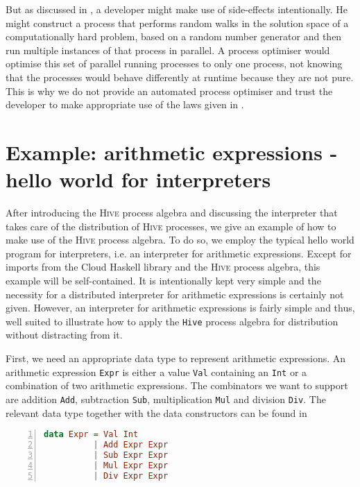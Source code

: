 But as discussed in , a developer might make use of side-effects intentionally. He might construct a process that performs random walks in the solution space of a computationally hard problem, based on a random number generator and then run multiple instances of that process in parallel. A process optimiser would optimise this set of parallel running processes to only one process, not knowing that the processes would behave differently at runtime because they are not pure. This is why we do not provide an automated process optimiser and trust the developer to make appropriate use of the laws given in .

\section{Example: arithmetic expressions - hello world for interpreters}
\label{chp:example}
After introducing the \textsc{Hive} process algebra and discussing the interpreter that takes care of the distribution of \textsc{Hive} processes, we give an example of how to make use of the \textsc{Hive} process algebra. To do so, we employ the typical hello world program for interpreters, i.e. an interpreter for arithmetic expressions. Except for imports from the \textsf{Cloud Haskell} library and the \textsc{Hive} process algebra, this example will be self-contained. It is intentionally kept very simple and the necessity for a distributed interpreter for arithmetic expressions is certainly not given. However, an interpreter for arithmetic expressions is fairly simple and thus, well suited to illustrate how to apply the \texttt{Hive} process algebra for distribution without distracting from it.

First, we need an appropriate data type to represent arithmetic expressions. An arithmetic expression \texttt{Expr} is either a value \texttt{Val} containing an \texttt{Int} or a combination of two arithmetic expressions. The combinators we want to support are addition \texttt{Add}, subtraction \texttt{Sub}, multiplication \texttt{Mul} and division \texttt{Div}. The relevant data type together with the data constructors can be found in  
\begin{lstlisting}[language=Haskell, caption=Data model for the representation of arithmetic expressions., label=lst:arith_model, numbers=left, frame=bt]
data Expr = Val Int
          | Add Expr Expr
          | Sub Expr Expr
          | Mul Expr Expr
          | Div Expr Expr
\end{lstlisting}

